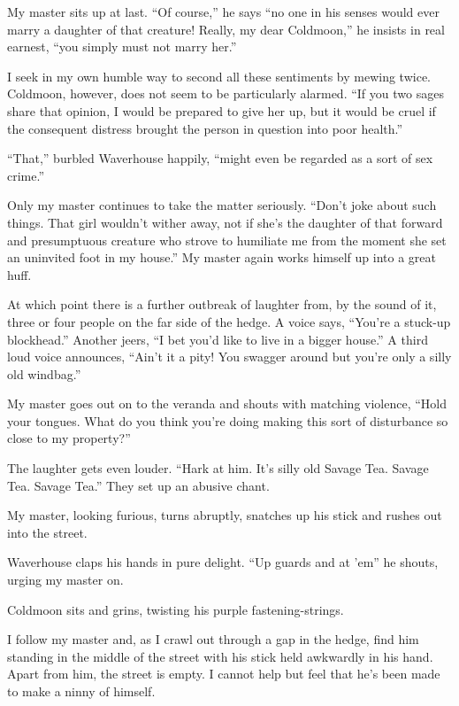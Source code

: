 \documentclass[12pt, openright]{book}
\newcommand\blankpage{%
    \null
    \thispagestyle{empty}%
    \addtocounter{page}{-1}%
    \newpage}
\begin{document}
My master sits up at last. ``Of course,'' he says ``no one in his senses
would ever marry a daughter of that creature! Really, my dear
Coldmoon,'' he insists in real earnest, ``you simply must not marry
her.''

I seek in my own humble way to second all these sentiments by mewing
twice. Coldmoon, however, does not seem to be particularly alarmed. ``If
you two sages share that opinion, I would be prepared to give her up,
but it would be cruel if the consequent distress brought the person in
question into poor health.''

``That,'' burbled Waverhouse happily, ``might even be regarded as a sort
of sex crime.''

Only my master continues to take the matter seriously. ``Don't joke
about such things. That girl wouldn't wither away, not if she's the
daughter of that forward and presumptuous creature who strove to
humiliate me from the moment she set an uninvited foot in my house.'' My
master again works himself up into a great huff.

At which point there is a further outbreak of laughter from, by the
sound of it, three or four people on the far side of the hedge. A voice
says, ``You're a stuck-up blockhead.'' Another jeers, ``I bet you'd like
to live in a bigger house.'' A third loud voice announces, ``Ain't it a
pity! You swagger around but you're only a silly old windbag.''

My master goes out on to the veranda and shouts with matching violence,
``Hold your tongues. What do you think you're doing making this sort of
disturbance so close to my property?''

The laughter gets even louder. ``Hark at him. It's silly old Savage Tea.
Savage Tea. Savage Tea.'' They set up an abusive chant.

My master, looking furious, turns abruptly, snatches up his stick and
rushes out into the street.

Waverhouse claps his hands in pure delight. ``Up guards and at 'em'' he
shouts, urging my master on.

Coldmoon sits and grins, twisting his purple fastening-strings.

I follow my master and, as I crawl out through a gap in the hedge, find
him standing in the middle of the street with his stick held awkwardly
in his hand. Apart from him, the street is empty. I cannot help but feel
that he's been made to make a ninny of himself.
\afterpage{\blankpage}
\afterpage{\blankpage}
\end{document}
